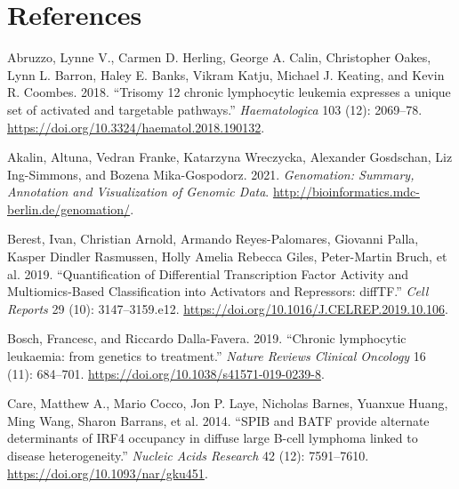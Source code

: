 \documentclass[11pt, a4paper, twosided]{book}
\newenvironment{CSLReferences}%
  {}%
  {\par}
\begin{document}
\newpage

\hypertarget{references}{%
\chapter*{References}\label{references}}

\noindent

\setlength{\parindent}{-0.5cm}
\setlength{\leftskip}{0.5cm}
\setlength{\parskip}{8pt}

\hypertarget{refs}{}
\begin{CSLReferences}{1}{0}
\leavevmode{}%
Abruzzo, Lynne V., Carmen D. Herling, George A. Calin, Christopher Oakes, Lynn L. Barron, Haley E. Banks, Vikram Katju, Michael J. Keating, and Kevin R. Coombes. 2018. {``{Trisomy 12 chronic lymphocytic leukemia expresses a unique set of activated and targetable pathways}.''} \emph{Haematologica} 103 (12): 2069--78. \url{https://doi.org/10.3324/haematol.2018.190132}.

\leavevmode{}%
Akalin, Altuna, Vedran Franke, Katarzyna Wreczycka, Alexander Gosdschan, Liz Ing-Simmons, and Bozena Mika-Gospodorz. 2021. \emph{Genomation: Summary, Annotation and Visualization of Genomic Data}. \url{http://bioinformatics.mdc-berlin.de/genomation/}.

\leavevmode{}%
Berest, Ivan, Christian Arnold, Armando Reyes-Palomares, Giovanni Palla, Kasper Dindler Rasmussen, Holly Amelia Rebecca Giles, Peter-Martin Bruch, et al. 2019. {``{Quantification of Differential Transcription Factor Activity and Multiomics-Based Classification into Activators and Repressors: diffTF}.''} \emph{Cell Reports} 29 (10): 3147--3159.e12. \url{https://doi.org/10.1016/J.CELREP.2019.10.106}.

\leavevmode{}%
Bosch, Francesc, and Riccardo Dalla-Favera. 2019. {``{Chronic lymphocytic leukaemia: from genetics to treatment}.''} \emph{Nature Reviews Clinical Oncology} 16 (11): 684--701. \url{https://doi.org/10.1038/s41571-019-0239-8}.

\leavevmode{}%
Care, Matthew A., Mario Cocco, Jon P. Laye, Nicholas Barnes, Yuanxue Huang, Ming Wang, Sharon Barrans, et al. 2014. {``{SPIB and BATF provide alternate determinants of IRF4 occupancy in diffuse large B-cell lymphoma linked to disease heterogeneity}.''} \emph{Nucleic Acids Research} 42 (12): 7591--7610. \url{https://doi.org/10.1093/nar/gku451}.


\end{CSLReferences}
\end{document}
